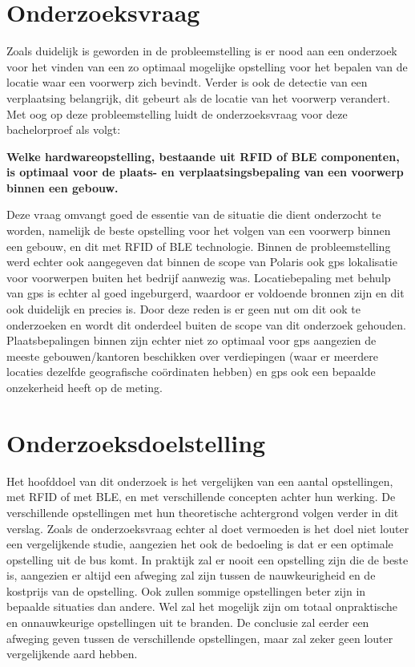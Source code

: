 \section{Onderzoeksvraag}
\label{sec:onderzoeksvraag}

Zoals duidelijk is geworden in de probleemstelling is er nood aan een onderzoek voor het vinden van een zo optimaal mogelijke opstelling voor het bepalen van de locatie waar een voorwerp zich bevindt. Verder is ook de detectie van een verplaatsing belangrijk, dit gebeurt als de locatie van het voorwerp verandert. Met oog op deze probleemstelling luidt de onderzoeksvraag voor deze bachelorproef als volgt:
\begin{center}
	\textbf{Welke hardwareopstelling, bestaande uit RFID of BLE componenten, is optimaal voor de plaats- en verplaatsingsbepaling van een voorwerp binnen een gebouw.}
\end{center}
Deze vraag omvangt goed de essentie van de situatie die dient onderzocht te worden, namelijk de beste opstelling voor het volgen van een voorwerp binnen een gebouw, en dit met RFID of BLE technologie. Binnen de probleemstelling werd echter ook aangegeven dat binnen de scope van Polaris ook gps lokalisatie voor voorwerpen buiten het bedrijf aanwezig was. Locatiebepaling met behulp van gps is echter al goed ingeburgerd, waardoor er voldoende bronnen zijn en dit ook duidelijk en precies is. Door deze reden is er geen nut om dit ook te onderzoeken en wordt dit onderdeel buiten de scope van dit onderzoek gehouden. Plaatsbepalingen binnen zijn echter niet zo optimaal voor gps aangezien de meeste gebouwen/kantoren beschikken over verdiepingen (waar er meerdere locaties dezelfde geografische coördinaten hebben) en gps ook een bepaalde onzekerheid heeft op de meting.

\section{Onderzoeksdoelstelling}
\label{sec:onderzoeksdoelstelling}

Het hoofddoel van dit onderzoek is het vergelijken van een aantal opstellingen, met RFID of met BLE, en met verschillende concepten achter hun werking. De verschillende opstellingen met hun theoretische achtergrond volgen verder in dit verslag. Zoals de onderzoeksvraag echter al doet vermoeden is het doel niet louter een vergelijkende studie, aangezien het ook de bedoeling is dat er een optimale opstelling uit de bus komt. 
In praktijk zal er nooit een opstelling zijn die de beste is, aangezien er altijd een afweging zal zijn tussen de nauwkeurigheid en de kostprijs van de opstelling. Ook zullen sommige opstellingen beter zijn in bepaalde situaties dan andere. Wel zal het mogelijk zijn om totaal onpraktische en onnauwkeurige opstellingen uit te branden. De conclusie zal eerder een afweging geven tussen de verschillende opstellingen, maar zal zeker geen louter vergelijkende aard hebben.

